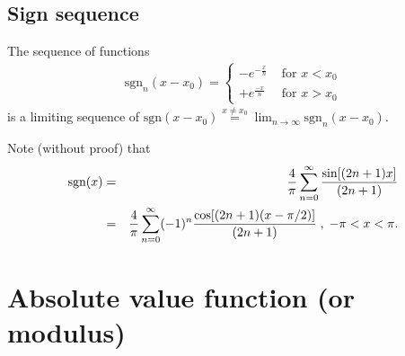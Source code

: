 \subsection{Sign sequence}


The sequence of functions
\begin{equation}
\begin{split}
\textrm{sgn}_n(x-x_0)
=
\left\{
\begin{array}{rl}
- e^{-\frac{x}{n}}&\textrm{ for } x < x_0\\
+ e^{\frac{-x}{n}}&\textrm{ for } x > x_0
\end{array}
\right.
\end{split}
\label{2012-m-ch-di-lsegn}
\end{equation}
is a limiting sequence of
$
\textrm{sgn}(x-x_0)\stackrel{x\neq x_0}{=} \lim_{n\rightarrow \infty} \textrm{sgn}_n(x-x_0)
$.

Note (without proof) that
\begin{eqnarray}
\mbox{sgn}(x)
&=&{4\over \pi }\sum_{n=0}^\infty {\sin [
(2n+1)x]\over
(2n+1)}\\
&=&{4\over \pi }\sum_{n=0}^\infty (-1)^n{\cos [
(2n+1)(x-\pi /2)]\over
(2n+1)}\;,\; -\pi <x<\pi  .
 \end{eqnarray}



\section{Absolute value function (or modulus)}

